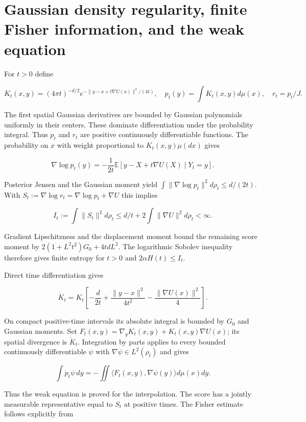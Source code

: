 \documentclass[11pt,a4paper]{article}
\begin{document}
\section{\texorpdfstring{Gaussian density regularity, finite Fisher information, and the weak equation}{Gaussian density regularity, finite Fisher information, and the weak equation}}


For \(t>0\) define

\[K_t(x,y)=(4\pi t)^{-d/2}e^{-\|y-x+t\nabla U(x)\|^2/(4t)},\quad
p_t(y)=\int K_t(x,y)d\mu(x),\quad r_t=p_t/J.\]

The first spatial Gaussian derivatives are bounded by Gaussian polynomials uniformly in their centers. These dominate differentiation under the probability integral. Thus \(p_t\) and \(r_t\) are positive continuously differentiable functions. The probability on \(x\) with weight proportional to \(K_t(x,y)\mu(dx)\) gives

\[\nabla\log p_t(y)=-\frac1{2t}\mathbb E[y-X+t\nabla U(X)\mid Y_t=y].\]

Posterior Jensen and the Gaussian moment yield \(\int\|\nabla\log p_t\|^2d\rho_t\le d/(2t)\). With \(S_t:=\nabla\log r_t=\nabla\log p_t+\nabla U\) this implies

\[I_t:=\int\|S_t\|^2d\rho_t\le d/t+2\int\|\nabla U\|^2d\rho_t<\infty.\]

Gradient Lipschitzness and the displacement moment bound the remaining score moment by \(2(1+L^2t^2)G_0+4tdL^2\). The logarithmic Sobolev inequality therefore gives finite entropy for \(t>0\) and \(2\alpha H(t)\le I_t\).



Direct time differentiation gives

\[\dot K_t=K_t\left[-\frac d{2t}+\frac{\|y-x\|^2}{4t^2}-\frac{\|\nabla U(x)\|^2}{4}\right].\]

On compact positive-time intervals its absolute integral is bounded by \(G_0\) and Gaussian moments. Set \(F_t(x,y)=\nabla_y K_t(x,y)+K_t(x,y)\nabla U(x)\); its spatial divergence is \(\dot K_t\). Integration by parts applies to every bounded continuously differentiable \(\psi\) with \(\nabla\psi\in L^2(\rho_t)\) and gives

\[\int\dot p_t\psi\,dy=-\iint\langle F_t(x,y),\nabla\psi(y)\rangle d\mu(x)dy.\]

Thus the weak equation is proved for the interpolation. The score has a jointly measurable representative equal to \(S_t\) at positive times. The Fisher estimate follows explicitly from
\end{document}
